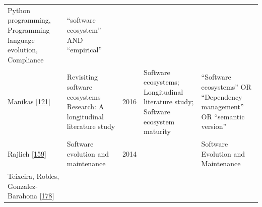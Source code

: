 \documentclass[]{book}
\begin{document}
\begin{longtable}[]{@{}lllll@{}}
\begin{minipage}[t]{0.34\columnwidth}
Python programming, Programming language evolution, Compliance\strut
\end{minipage} & \begin{minipage}[t]{0.13\columnwidth}\raggedright\strut
``software ecosystem'' AND ``empirical''\strut
\end{minipage}\tabularnewline
\begin{minipage}[t]{0.05\columnwidth}\raggedright\strut
Manikas {[}\protect\hyperlink{ref-Manikas2016}{121}{]}\strut
\end{minipage} & \begin{minipage}[t]{0.31\columnwidth}\raggedright\strut
Revisiting software ecosystems Research: A longitudinal literature
study\strut
\end{minipage} & \begin{minipage}[t]{0.02\columnwidth}\raggedright\strut
2016\strut
\end{minipage} & \begin{minipage}[t]{0.34\columnwidth}\raggedright\strut
Software ecosystems; Longitudinal literature study; Software ecosystem
maturity\strut
\end{minipage} & \begin{minipage}[t]{0.13\columnwidth}\raggedright\strut
``Software ecosystems'' OR ``Dependency management'' OR ``semantic
version''\strut
\end{minipage}\tabularnewline
\begin{minipage}[t]{0.05\columnwidth}\raggedright\strut
Rajlich {[}\protect\hyperlink{ref-Rajlich2014}{159}{]}\strut
\end{minipage} & \begin{minipage}[t]{0.31\columnwidth}\raggedright\strut
Software evolution and maintenance\strut
\end{minipage} & \begin{minipage}[t]{0.02\columnwidth}\raggedright\strut
2014\strut
\end{minipage} & \begin{minipage}[t]{0.34\columnwidth}\raggedright\strut
\strut
\end{minipage} & \begin{minipage}[t]{0.13\columnwidth}\raggedright\strut
Software Evolution and Maintenance\strut
\end{minipage}\tabularnewline
\begin{minipage}[t]{0.05\columnwidth}\raggedright\strut
Teixeira, Robles, Gonzalez-Barahona
{[}\protect\hyperlink{ref-Teixeira2015}{178}{]}\strut
\end{minipage} & \begin{minipage}[t]{0.31\columnwidth}\raggedright\strut

\end{minipage}
\end{longtable}
\end{document}
